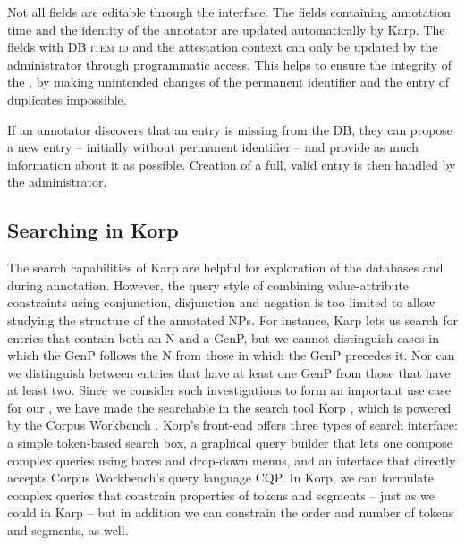 \documentclass[output=paper,colorlinks,citecolor=brown]{langscibook}
\begin{document}
Not all fields are editable through the interface. The fields containing annotation time and the identity of the annotator are updated automatically by Karp. The fields with \textsc{DB item id} and the attestation context can only be updated by the  administrator
through programmatic access. This helps to ensure the integrity of the , by making unintended changes of the permanent identifier and the entry of duplicates impossible.

If an annotator discovers that an entry is missing from the DB, they can propose a new entry -- initially without permanent identifier -- and provide as much information about it as possible. Creation of a
full, valid entry is then handled by the  administrator.

\subsection{Searching in Korp}

The search capabilities of Karp are helpful for exploration of the databases and during annotation. However, the query style of combining value-attribute constraints using conjunction, disjunction and negation is too limited to allow studying the structure of the annotated NPs. For instance, Karp lets us search for entries that contain both an N and a GenP, but we cannot distinguish cases in which the GenP follows the N from those in which the GenP precedes it. Nor can we distinguish between entries that have at least one GenP from those that have at least two. Since we consider such investigations to form an important use case for our , we have made the  searchable in the  search tool Korp \citep{korp}, which is powered by the Corpus Workbench \citep{cwb}. Korp's front-end offers three types of search interface: a simple token-based search box, a graphical query builder that lets one compose complex queries using boxes and drop-down menus, and an interface that directly accepts Corpus Workbench's query language CQP. In Korp, we can formulate complex queries that constrain properties of tokens and segments -- just as we could in Karp -- but in addition we can constrain the order and number of tokens and segments, as well.
\end{document}
